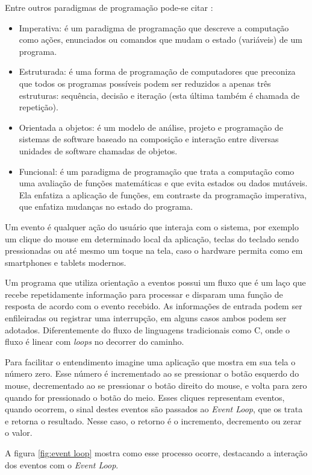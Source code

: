 Entre outros paradigmas de programação pode-se citar \cite{prdgProg}:
\begin{itemize}
  \item Imperativa: é um paradigma de programação que descreve a computação como ações, enunciados ou comandos que mudam o estado (variáveis) de um programa.
  \item Estruturada: é uma forma de programação de computadores que preconiza que todos os programas possíveis podem ser reduzidos a apenas três estruturas: sequência, decisão e iteração (esta última também é chamada de repetição).
  \item Orientada a objetos: é um modelo de análise, projeto e programação de sistemas de software baseado na composição e interação entre diversas unidades de software chamadas de objetos.
  \item Funcional: é um paradigma de programação que trata a computação como uma avaliação de funções matemáticas e que evita estados ou dados mutáveis. Ela enfatiza a aplicação de funções, em contraste da programação imperativa, que enfatiza mudanças no estado do programa.
\end{itemize}

Um evento é qualquer ação do usuário que interaja com o sistema, por exemplo um clique do mouse em determinado local da aplicação, teclas do teclado sendo pressionadas ou até mesmo um toque na tela, caso o hardware permita como em smartphones e tablets modernos.

Um programa que utiliza orientação a eventos possui um fluxo que é um laço que recebe repetidamente informação para processar e disparam uma função de resposta de acordo com o evento recebido. As informações de entrada podem ser enfileiradas ou registrar uma interrupção, em alguns casos ambos podem ser adotados. Diferentemente do fluxo de linguagens tradicionais como C, onde o fluxo é linear com \textit{loops} no decorrer do caminho.

Para facilitar o entendimento imagine uma aplicação que mostra em sua tela o número zero. Esse número é incrementado ao se pressionar o botão esquerdo do mouse, decrementado ao se pressionar o botão direito do mouse, e volta para zero quando for pressionado o botão do meio. Esses cliques representam eventos, quando ocorrem, o sinal destes eventos são passados ao \textit{Event Loop}, que os trata e retorna o resultado. Nesse caso, o retorno é o incremento, decremento ou zerar o valor.

A figura \ref{fig:event loop} mostra como esse processo ocorre, destacando a interação dos eventos com o \textit{Event Loop}.

